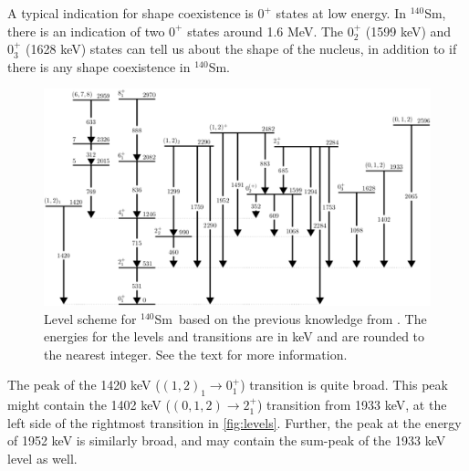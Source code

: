 \documentclass[twoside,english]{uiofysmaster/uiofysmaster}
\newcommand{\Sm}{$^{140}$Sm} %
\newcommand{\ga}{$\gamma$}
\let\orgautoref\autoref
\renewcommand{\autoref}
        {%
		 \def\sectionautorefname{Section}%
		 \def\subsectionautorefname{Section}%
		 \def\subsubsectionautorefname{Section}%
		 \def\chapterautorefname{Chapter}%
          \orgautoref}
\begin{document}
\begin{table}[H] 
    \centering 
    \caption{Known \ga\ transitions in \Sm\ based on \cite{Klintefjord, NNDC-levels}. 
    $E$ refers to the energy, $J^\pi$ is the spin and parity and $\sigma \lambda$ is the multipolarity. 
    $I_\gamma$ is the relative \ga\ intensity for transitions depopulating a given state, where the strongest transition is normalized to intensity 100.
    The column "Visible in \ga\ spectrum" describes if it is possible to see the transition in \autoref{fig:gam_dcB}.}
	
	\label{tab:gamma_trans}
\end{table}

A typical indication for shape coexistence is $0^+$ states at low energy. 
In \Sm, there is an indication of two $0^+$ states around 1.6 MeV.
The $0_2^{+}$ (1599 keV) and $0_3^{+}$ (1628 keV) states can tell us about the shape of the nucleus, in addition to if there is any shape coexistence in \Sm.  


\begin{figure}[ht!]
	\centering
	\includegraphics[width=\textwidth]{Images/Level-scheme-140Sm-v2.png}
	\caption{Level scheme for \Sm\ based on the previous knowledge from \cite{Klintefjord, NNDC-levels}. 
	The energies for the levels and transitions are in keV and are rounded to the nearest integer.
	See the text for more information.}
	\label{fig:levels}
\end{figure}


The peak of the 1420 keV ($(1,2)_1 \rightarrow 0_1^+$) transition is quite broad. 
This peak might contain the 1402 keV ($(0,1,2) \rightarrow 2_1^+$) transition from 1933 keV, at the left side of the rightmost transition in \autoref{fig:levels}.
Further, the peak at the energy of 1952 keV is similarly broad, and may contain the sum-peak of the 1933 keV level as well. 
\end{document}
